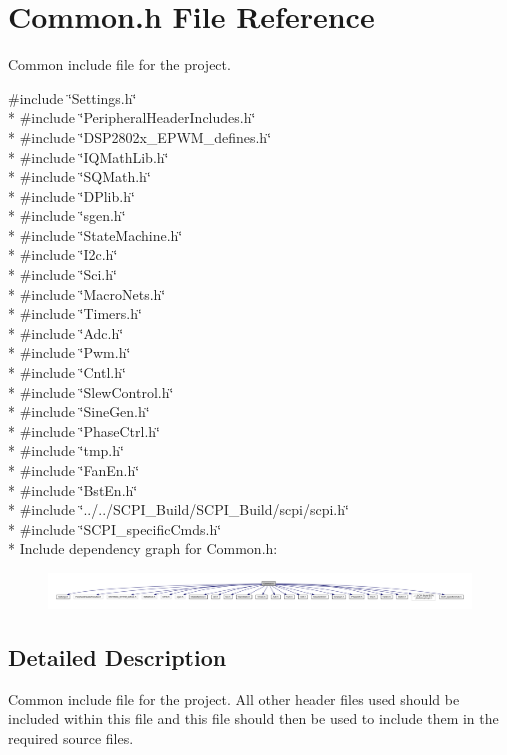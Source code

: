 \hypertarget{a00011}{\section{Common.\-h File Reference}
\label{a00011}
}


Common include file for the project.  


{\ttfamily \#include \char`\"{}Settings.\-h\char`\"{}}\\*
{\ttfamily \#include \char`\"{}Peripheral\-Header\-Includes.\-h\char`\"{}}\\*
{\ttfamily \#include \char`\"{}D\-S\-P2802x\-\_\-\-E\-P\-W\-M\-\_\-defines.\-h\char`\"{}}\\*
{\ttfamily \#include \char`\"{}I\-Q\-Math\-Lib.\-h\char`\"{}}\\*
{\ttfamily \#include \char`\"{}S\-Q\-Math.\-h\char`\"{}}\\*
{\ttfamily \#include \char`\"{}D\-Plib.\-h\char`\"{}}\\*
{\ttfamily \#include \char`\"{}sgen.\-h\char`\"{}}\\*
{\ttfamily \#include \char`\"{}State\-Machine.\-h\char`\"{}}\\*
{\ttfamily \#include \char`\"{}I2c.\-h\char`\"{}}\\*
{\ttfamily \#include \char`\"{}Sci.\-h\char`\"{}}\\*
{\ttfamily \#include \char`\"{}Macro\-Nets.\-h\char`\"{}}\\*
{\ttfamily \#include \char`\"{}Timers.\-h\char`\"{}}\\*
{\ttfamily \#include \char`\"{}Adc.\-h\char`\"{}}\\*
{\ttfamily \#include \char`\"{}Pwm.\-h\char`\"{}}\\*
{\ttfamily \#include \char`\"{}Cntl.\-h\char`\"{}}\\*
{\ttfamily \#include \char`\"{}Slew\-Control.\-h\char`\"{}}\\*
{\ttfamily \#include \char`\"{}Sine\-Gen.\-h\char`\"{}}\\*
{\ttfamily \#include \char`\"{}Phase\-Ctrl.\-h\char`\"{}}\\*
{\ttfamily \#include \char`\"{}tmp.\-h\char`\"{}}\\*
{\ttfamily \#include \char`\"{}Fan\-En.\-h\char`\"{}}\\*
{\ttfamily \#include \char`\"{}Bst\-En.\-h\char`\"{}}\\*
{\ttfamily \#include \char`\"{}../../\-S\-C\-P\-I\-\_\-\-Build/\-S\-C\-P\-I\-\_\-\-Build/scpi/scpi.\-h\char`\"{}}\\*
{\ttfamily \#include \char`\"{}S\-C\-P\-I\-\_\-specific\-Cmds.\-h\char`\"{}}\\*
Include dependency graph for Common.\-h\-:
\nopagebreak
\begin{figure}[H]
\begin{center}
\leavevmode
\includegraphics[width=350pt]{a00047}
\end{center}
\end{figure}


\subsection{Detailed Description}
Common include file for the project. All other header files used should be included within this file and this file should then be used to include them in the required source files. 